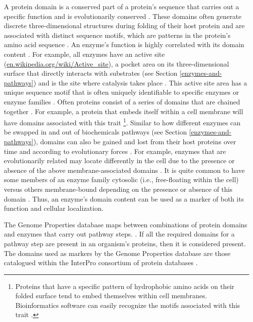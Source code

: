 A protein domain is a conserved part of a protein's sequence that carries out a specific function and is evolutionarily conserved \cite{ren2008conservation}. These domains often generate discrete three-dimensional structures during folding of their host protein \cite{ren2008conservation} and are associated with distinct sequence motifs, which are patterns in the protein's amino acid sequence \cite{ren2008conservation}. An enzyme's function is highly correlated with its domain content \cite{han2007folding}. For example, all enzymes have an active site (\href{en.wikipedia.org/wiki/Active\_site}{en.wikipedia.org/wiki/Active\_site}), a pocket area on its three-dimensional surface that directly interacts with substrates (see Section \ref{enzymes-and-pathways}) and is the site where catalysis takes place \cite{bugg2012introduction}. This active site area has a unique sequence motif that is often uniquely identifiable to specific enzymes or enzyme families \cite{ren2008conservation}. Often proteins consist of a series of domains that are chained together \cite{han2007folding}. For example, a protein that embeds itself within a cell membrane will have domains associated with this trait \footnote{Proteins that have a specific pattern of hydrophobic amino acids on their folded surface tend to embed themselves within cell membranes. Bioinformatics software can easily recognize the motifs associated with this trait  \cite{chen2003secreted,hennerdal2011rapid,von2006membrane}.}. Similar to how different enzymes can be swapped in and out of biochemicals pathways (see Section \ref{enzymes-and-pathways}), domains can also be gained and lost from their host proteins over time and according to evolutionary forces \cite{pasek2006gene}. For example, enzymes that are evolutionarily related may locate differently in the cell due to the presence or absence of the above membrane-associated domains \cite{wang1991existence,hiki1991cytosolic,balasubramanian1992cytosolic}. It is quite common to have some members of an enzyme family cytosolic (i.e., free-floating within the cell) versus others membrane-bound depending on the presence or absence of this domain \cite{wang1991existence,hiki1991cytosolic,balasubramanian1992cytosolic}. Thus, an enzyme's domain content can be used as a marker of both its function and cellular localization.

The Genome Properties database maps between combinations of protein domains and enzymes that carry out pathway steps. \cite{richardson2018genome}. If all the required domains for a pathway step are present in an organism's proteins, then it is considered present. The domains used as markers by the Genome Properties database are those catalogued within the InterPro consortium of protein databases \cite{apweiler2000interpro,richardson2018genome}.

